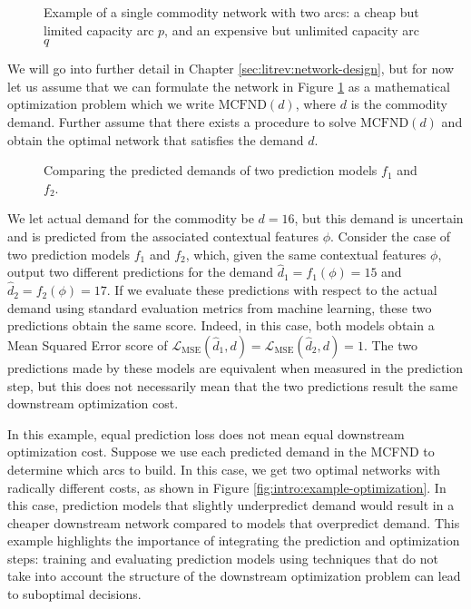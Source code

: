 \begin{figure}[ht]
    \centering
    
    \caption{Example of a  single commodity network with two arcs: a cheap but limited capacity arc $p$, and an expensive but unlimited capacity arc $q$}
    \label{fig:intro:example-network}
\end{figure}

We will go into further detail in Chapter \ref{sec:litrev:network-design}, but for now let us assume that we can formulate the network in Figure \ref{fig:intro:example-network} as a mathematical optimization problem which we write $\mathrm{MCFND}(d)$, where $d$ is the commodity demand. Further assume that there exists a procedure to solve $\mathrm{MCFND}(d)$ and obtain the optimal network that satisfies the demand $d$.

\begin{figure}[ht]
    \centering
    
    \caption{Comparing the predicted demands of two prediction models $f_1$ and $f_2$.}
    \label{fig:intro:example-prediction}
\end{figure}

We let actual demand for the commodity be $d = 16$, but this demand is uncertain and is predicted from the associated contextual features $\phi$. Consider the case of two prediction models $f_1$ and $f_2$, which, given the same contextual features $\phi$, output two different predictions for the demand  $\hat{d}_1 = f_1(\phi) = 15$ and $\hat{d}_2 = f_2(\phi) = 17$. If we evaluate these predictions with respect to the actual demand using standard evaluation metrics from machine learning, these two predictions obtain the same score. Indeed, in this case, both models obtain a Mean Squared Error score of $\mathcal{L}_{\text{MSE}}(\hat{d}_1, d) = \mathcal{L}_{\text{MSE}}(\hat{d}_2, d) = 1$. The two predictions made by these models are equivalent when measured in the prediction step, but this does not necessarily mean that the two predictions result the same downstream optimization cost.

In this example, equal prediction loss does not mean equal downstream optimization cost. Suppose we use each predicted demand in the MCFND to determine which arcs to build. In this case, we get two optimal networks with radically different costs, as shown in Figure \ref{fig:intro:example-optimization}. In this case, prediction models that slightly underpredict demand would result in a cheaper downstream network compared to models that overpredict demand. This example highlights the importance of integrating the prediction and optimization steps: training and evaluating prediction models using techniques that do not take into account the structure of the downstream optimization problem can lead to suboptimal decisions.

